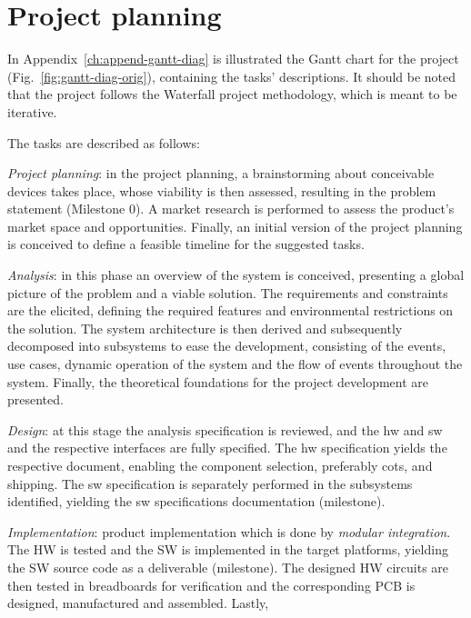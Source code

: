 \section{Project planning}%
\label{sec:project-planning}
%
In Appendix~\ref{ch:append-gantt-diag} is illustrated the Gantt chart for the
project (Fig.~\ref{fig:gantt-diag-orig}), containing the tasks' descriptions. It
should be noted that the project follows the Waterfall project
methodology, which is meant to be iterative.

The tasks are described as follows:
\begin{item-c}
\item \emph{Project planning}: in the project planning, a brainstorming about conceivable devices takes place, whose
viability is then assessed, resulting in the problem statement
(Milestone 0). A market research is performed to assess the product's market
space and opportunities. Finally, an initial version of the project planning is
conceived to define a feasible timeline for the suggested tasks.
%
\item \emph{Analysis}: in this phase an overview of the system is conceived,
  presenting a global picture of the problem and a viable solution. The
  requirements and constraints are the elicited, defining the required features
  and environmental restrictions on the solution. The system architecture is
  then derived and subsequently decomposed into subsystems to ease the
  development, consisting of the events, use cases, dynamic operation of the
  system and the flow of events throughout the system. Finally, the theoretical
  foundations for the project development are presented.
%
\item \emph{Design}: at this stage the analysis specification is reviewed, and
  the \gls{hw} and \gls{sw} and the respective interfaces are fully
  specified. The \gls{hw} specification yields the respective document, enabling
  the component selection, preferably \gls{cots}, and shipping. The \gls{sw} specification is separately performed in the
  subsystems identified, yielding the \gls{sw} specifications documentation (milestone).
%
\item \emph{Implementation}: product implementation which is done by
  \emph{modular integration}. The HW is tested and the SW is implemented in the
  target platforms, yielding the SW source code as a deliverable (milestone).
  The designed HW circuits are then tested in breadboards for verification and
  the corresponding \gls{PCB} is designed, manufactured and assembled. Lastly,

\end{item-c}
